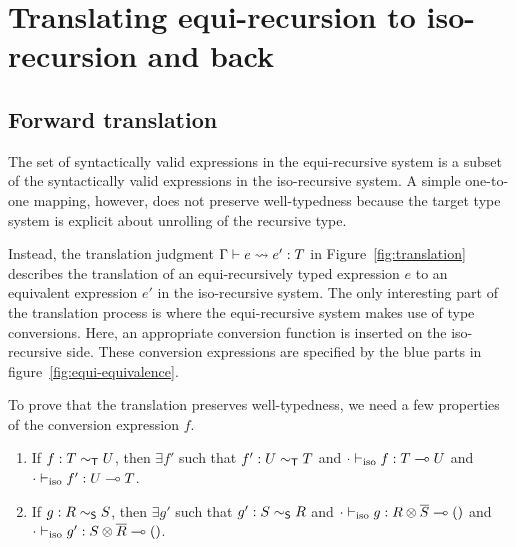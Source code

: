 \section{Translating equi-recursion to iso-recursion and back}

\subsection{Forward translation}
\label{sec:forward}


The set of syntactically valid expressions in the equi-recursive system is a
subset of the syntactically valid expressions in the iso-recursive system. A
simple one-to-one mapping, however, does not preserve well-typedness because
the target type system is explicit about unrolling of the recursive type.



Instead, the translation judgment $\translation e {e'} T$ in
Figure~\ref{fig:translation} describes the translation of an equi-recursively
typed expression $e$ to an equivalent expression $e'$ in the iso-recursive
system. The only interesting part of the translation process is where the
equi-recursive system makes use of type conversions. Here, an appropriate
conversion function is inserted on the iso-recursive side. These
conversion expressions are specified by the blue parts in figure~\ref{fig:equi-equivalence}.
\begin{mathpar}
\end{mathpar}

To prove that the translation preserves well-typedness, we
need a few properties of the conversion expression $f$.
\begin{lemma}
  \begin{enumerate}
  \item If $f : T \eqt U$, then $\exists f'$ such that  $f' : U \eqt
    T$ and $\typing[\CNil]{\tyIso f}{\TFun TU}$ and $\typing[\CNil]{\tyIso f'}{\TFun UT}$.
  \item If $g : R \eqs S$, then $\exists g'$ such that  $g' : S \eqs
    R$ and $\typing[\CNil]{\tyIso g}{\TFun{\TPair
      R {\TDual S}} \TUnit}$ and $\typing[\CNil]{\tyIso g'}{\TFun{\TPair
      S {\TDual R}} \TUnit}$.
  \end{enumerate}
\end{lemma}

